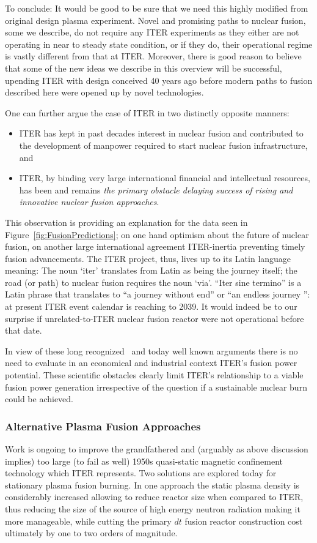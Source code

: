 \documentclass[particles,article,accept,pdftex,moreauthors]{Definitions/mdpi}
\newcommand{\rf}[1]{Figure~\ref{#1}}
\begin{document}
To conclude: It would be good to be sure that we need this highly modified from original design plasma experiment. Novel and promising paths to nuclear fusion, some we describe, do not require any ITER experiments as they either are not operating in near to steady state condition, or if they do, their operational regime is vastly different from that at ITER. Moreover, there is good reason to believe that some of the new ideas we describe in this overview will be successful, upending ITER with design conceived 40 years ago before modern paths to fusion described here were opened up by novel technologies.

One can further argue the case of ITER in two distinctly opposite manners: 
\begin{itemize}
\item ITER has kept in past decades interest in nuclear fusion and contributed to the development of manpower required to start nuclear fusion infrastructure, and 
\item ITER, by binding very large international financial and intellectual resources, has been and remains {\em the primary obstacle delaying success of rising and innovative nuclear fusion approaches}. 
\end{itemize}
This observation is providing an explanation for the data seen in \rf{fig:FusionPredictions}; on one hand optimism about the future of nuclear fusion, on another large international agreement ITER-inertia preventing timely fusion advancements. The ITER project, thus, lives up to its Latin language meaning: The noun `iter' translates from Latin as being the journey itself; the road (or path) to nuclear fusion requires the noun `via'. ``Iter sine termino'' is a Latin phrase that translates to ``a journey without end'' or ``an endless journey '': at present ITER event calendar is reaching to 2039. It would indeed be to our surprise if unrelated-to-ITER nuclear fusion reactor were not operational before that date.

In view of these long recognized~\cite{lidsky1983trouble} and today well known arguments there is no need to evaluate in an economical and industrial context ITER's fusion power potential. These scientific obstacles  clearly limit ITER's relationship to a viable fusion power generation irrespective of the question if a sustainable nuclear burn could be achieved.

\subsubsection{Alternative Plasma Fusion Approaches}\label{sssec:INTnewPlasma}
Work is ongoing to improve the grandfathered and (arguably as above discussion implies) too large (to fail as well) 1950s quasi-static magnetic confinement technology which ITER represents. Two solutions are explored today for stationary plasma fusion burning. In one approach the static plasma density is considerably increased allowing to reduce reactor size when compared to ITER, thus reducing the size of the source of high energy neutron radiation making it more manageable, while cutting the primary $dt$ fusion reactor construction cost ultimately by one to two orders of magnitude.
\end{document}
